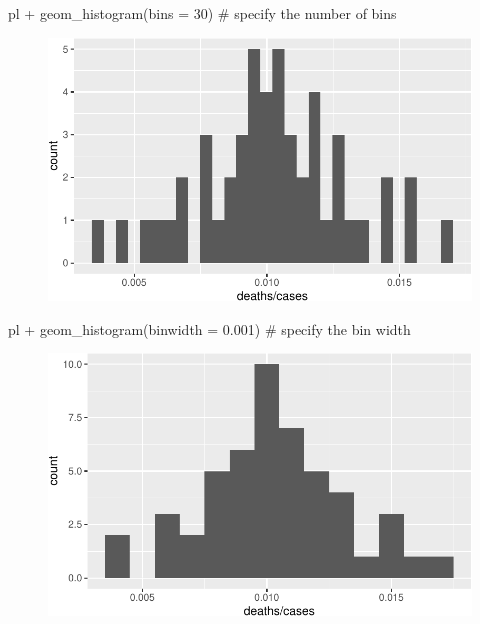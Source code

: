 \documentclass[
  letterpaper,
  DIV=11,
  numbers=noendperiod]{scrreprt}
\newenvironment{Shaded}{\begin{snugshade}}{\end{snugshade}}
\newcommand{\AttributeTok}[1]{\textcolor[rgb]{0.40,0.45,0.13}{#1}}
\newcommand{\CommentTok}[1]{\textcolor[rgb]{0.37,0.37,0.37}{#1}}
\newcommand{\DecValTok}[1]{\textcolor[rgb]{0.68,0.00,0.00}{#1}}
\newcommand{\FloatTok}[1]{\textcolor[rgb]{0.68,0.00,0.00}{#1}}
\newcommand{\FunctionTok}[1]{\textcolor[rgb]{0.28,0.35,0.67}{#1}}
\newcommand{\NormalTok}[1]{\textcolor[rgb]{0.00,0.23,0.31}{#1}}
\newcommand{\SpecialCharTok}[1]{\textcolor[rgb]{0.37,0.37,0.37}{#1}}
\begin{document}
\begin{Shaded}
\begin{Highlighting}[]
\NormalTok{pl }\SpecialCharTok{+} \FunctionTok{geom\_histogram}\NormalTok{(}\AttributeTok{bins =} \DecValTok{30}\NormalTok{) }\CommentTok{\# specify the number of bins}
\end{Highlighting}
\end{Shaded}

\begin{figure}[H]

{\centering \includegraphics{./01-dataviz_files/figure-pdf/unnamed-chunk-11-1.pdf}

}

\end{figure}

\begin{Shaded}
\begin{Highlighting}[]
\NormalTok{pl }\SpecialCharTok{+} \FunctionTok{geom\_histogram}\NormalTok{(}\AttributeTok{binwidth =} \FloatTok{0.001}\NormalTok{) }\CommentTok{\# specify the bin width}
\end{Highlighting}
\end{Shaded}

\begin{figure}[H]

{\centering \includegraphics{./01-dataviz_files/figure-pdf/unnamed-chunk-11-2.pdf}

}

\end{figure}
\end{document}
